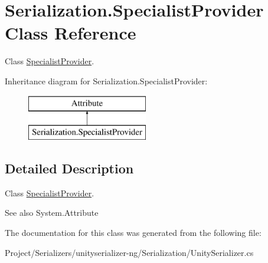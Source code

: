 \hypertarget{class_serialization_1_1_specialist_provider}{}\section{Serialization.\+Specialist\+Provider Class Reference}
\label{class_serialization_1_1_specialist_provider}


Class \hyperlink{class_serialization_1_1_specialist_provider}{Specialist\+Provider}.  


Inheritance diagram for Serialization.\+Specialist\+Provider\+:\begin{figure}[H]
\begin{center}
\leavevmode
\includegraphics[height=2.000000cm]{class_serialization_1_1_specialist_provider}
\end{center}
\end{figure}


\subsection{Detailed Description}
Class \hyperlink{class_serialization_1_1_specialist_provider}{Specialist\+Provider}. 

\begin{DoxySeeAlso}{See also}
System.\+Attribute


\end{DoxySeeAlso}


The documentation for this class was generated from the following file\+:\begin{DoxyCompactItemize}
\item 
Project/\+Serializers/unityserializer-\/ng/\+Serialization/Unity\+Serializer.\+cs\end{DoxyCompactItemize}
